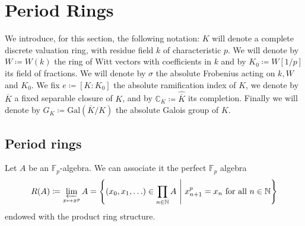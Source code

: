 \section{Period Rings}
We introduce, for this section, the following notation:
$K$ will denote a complete discrete valuation ring, with residue field $k$
of characteristic $p$.
We will denote by $W \coloneqq W(k)$ the ring of Witt vectors with coefficients in $k$
and by $K_0 \coloneqq W[1/p]$ its field of fractions.
We will denote by $\sigma$ the absolute Frobenius acting
on $k, W$ and $K_0$.
We fix $e \coloneqq [ K : K_0 ]$ the absolute ramification index of $K$,
we denote by $\overline{K}$ a fixed separable closure of $K$,
and by $\mathbb{C}_K \coloneqq \widehat{\overline{K}}$ its completion.
Finally we will denote by $G_K \coloneqq \mathrm{Gal}\left( \overline{K} / K \right)$ 
the absolute Galois group of $K$.



\subsection{Period rings}
\begin{defn}[]
	Let $A$ be an $\mathbb{F}_p$-algebra.
	We can associate it the perfect $\mathbb{F}_p$ algebra
	\begin{equation*}
		R(A) \coloneqq \varprojlim_{x \mapsto x^p} A =
		\left\{ \left( x_0, x_1, \ldots \right) \in \prod_{n \in \mathbb{N}} A
		\ \middle|\ x_{n+1}^p = x_n \text{ for all } n \in \mathbb{N} \right\}
	\end{equation*}
	endowed with the product ring structure.
\end{defn}


